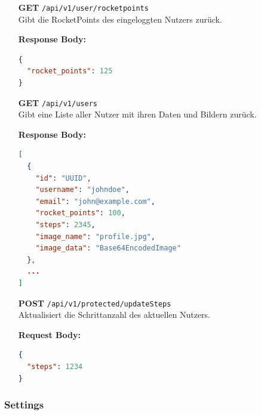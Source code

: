\documentclass[11pt,a4paper]{article}
\begin{document}
\begin{itemize}
\textbf{Request Body (optional):}
\begin{lstlisting}[language=json]
{
  "user_id": "UUID"
}
\end{lstlisting}

\textbf{Response Body:}
\begin{lstlisting}[language=json]
{
  "username": "johndoe",
  "name": "profile.jpg",
  "mime_type": "image/jpeg",
  "data": "Base64EncodedImage"
}
\end{lstlisting}

\item[\textbf{GET}] \texttt{/api/v1/user/rocketpoints} \\
Gibt die RocketPoints des eingeloggten Nutzers zurück.

\textbf{Response Body:}
\begin{lstlisting}[language=json]
{
  "rocket_points": 125
}
\end{lstlisting}

\item[\textbf{GET}] \texttt{/api/v1/users} \\
Gibt eine Liste aller Nutzer mit ihren Daten und Bildern zurück.

\textbf{Response Body:}
\begin{lstlisting}[language=json]
[
  {
    "id": "UUID",
    "username": "johndoe",
    "email": "john@example.com",
    "rocket_points": 100,
    "steps": 2345,
    "image_name": "profile.jpg",
    "image_data": "Base64EncodedImage"
  },
  ...
]
\end{lstlisting}

    \item[\textbf{POST}] \texttt{/api/v1/protected/updateSteps} \\
    Aktualisiert die Schrittanzahl des aktuellen Nutzers.

    \textbf{Request Body:}
    \begin{lstlisting}[language=json]
{
  "steps": 1234
}
    \end{lstlisting}
\end{itemize}


\subsubsection{Settings}
\end{document}
